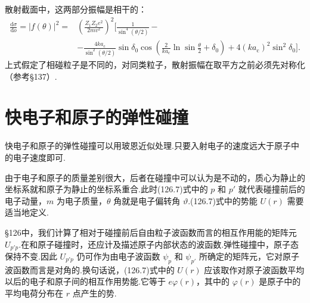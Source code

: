 散射截面中，这两部分振幅是相干的：
\begin{equation}
\begin{aligned}
  \frac{\mathrm{d}\sigma}{\mathrm{d}o}=|f(\theta)|^2
  ={}&\left(\frac{Z_1Z_2e^2}{2mv^2}\right)^{2}
  \biggl[\frac{1}{\sin^4(\theta/2)}-\\
  &-\frac{4ka_{\mathrm{c}}}{\sin^2(\theta/2)}
  \sin\delta_0\cos\left(\frac{2}{ka_{\mathrm{c}}}\ln\sin\frac{\theta}{2}
  +\delta_0\right)
  +4(ka_{\mathrm{c}})^2\sin^2\delta_0\biggr].
\end{aligned}
\end{equation}
上式假定了相碰粒子是不同的，对同类粒子，散射振幅在取平方之前必须先对称化（参考§137）.

\section{快电子和原子的弹性碰撞}

快电子和原子的弹性碰撞可以用玻恩近似处理.只要入射电子的速度远大于原子中的电子速度即可.

由于电子和原子的质量差别很大，后者在碰撞中可以认为是不动的，质心为静止的坐标系就和原子为静止的坐标系重合.此时(126.7)式中的 $p$ 和 $p'$ 就代表碰撞前后的电子动量，$m$ 为电子质量，$\theta$ 角就是电子偏转角 $\vartheta$.(126.7)式中的势能 $U(r)$ 需要适当地定义.

§126中，我们计算了相对于碰撞前后自由粒子波函数而言的相互作用能的矩阵元 $U_{p'p}$.在和原子碰撞时，还应计及描述原子内部状态的波函数.弹性碰撞中，原子态保持不变.因此 $U_{p'p}$ 仍可作为由电子波函数 $\psi_p$ 和 $\psi_{p'}$ 所确定的矩阵元，它对原子波函数而言是对角的.换句话说，(126.7)式中的 $U(r)$ 应该取作对原子波函数平均以后的电子和原子间的相互作用势能.它等于 $e\varphi(r)$，其中的 $\varphi(r)$ 是原子中的平均电荷分布在 $r$ 点产生的势.

